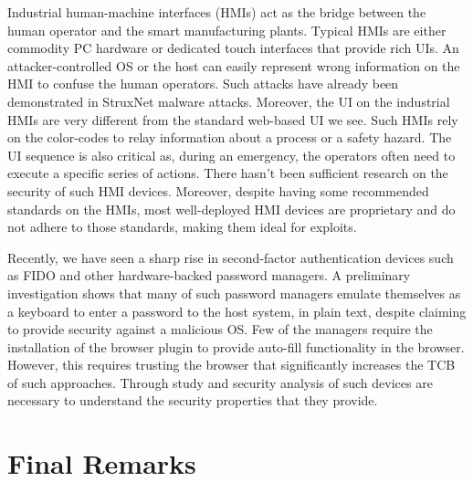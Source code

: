  Industrial human-machine interfaces (HMIs) act as the bridge between the human operator and the smart manufacturing plants. Typical HMIs are either commodity PC hardware or dedicated touch interfaces that provide rich UIs. An attacker-controlled OS or the host can easily represent wrong information on the HMI to confuse the human operators. Such attacks have already been demonstrated in StruxNet malware attacks. Moreover, the UI on the industrial HMIs are very different from the standard web-based UI we see. Such HMIs rely on the color-codes to relay information about a process or a safety hazard. The UI sequence is also critical as, during an emergency, the operators often need to execute a specific series of actions. There hasn't been sufficient research on the security of such HMI devices. Moreover, despite having some recommended standards on the HMIs, most well-deployed HMI devices are proprietary and do not adhere to those standards, making them ideal for exploits. 


 Recently, we have seen a sharp rise in second-factor authentication devices such as FIDO and other hardware-backed password managers. A preliminary investigation shows that many of such password managers emulate themselves as a keyboard to enter a password to the host system, in plain text, despite claiming to provide security against a malicious OS. Few of the managers require the installation of the browser plugin to provide auto-fill functionality in the browser. However, this requires trusting the browser that significantly increases the TCB of such approaches. Through study and security analysis of such devices are necessary to understand the security properties that they provide.



\section{Final Remarks}



